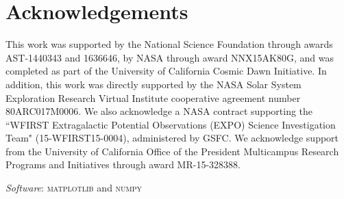 \documentclass[a4paper,fleqn,usenatbib]{mnras}
\begin{document}
\section*{Acknowledgements}

This work was supported by the National Science Foundation through awards AST-1440343 and 1636646, by NASA through award NNX15AK80G, and was completed as part of the University of California Cosmic Dawn Initiative. In addition, this work was directly supported by the NASA Solar System Exploration Research Virtual Institute cooperative agreement number 80ARC017M0006. 
We also acknowledge a NASA contract supporting the ``WFIRST Extragalactic Potential Observations (EXPO) Science Investigation Team" (15-WFIRST15-0004), administered by GSFC. We acknowledge support from the University of California Office of the President Multicampus Research Programs and Initiatives through award MR-15-328388.

\emph{Software}: \textsc{matplotlib} \citep{matplotlib} and \textsc{numpy} \citep{numpy}















\bsp	%
\label{lastpage}
\end{document}
